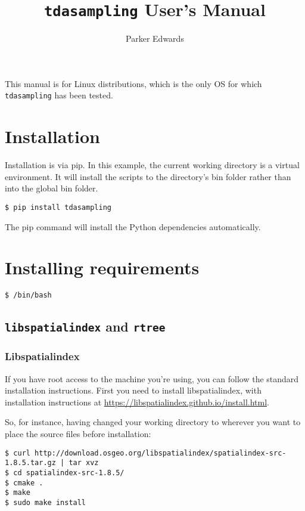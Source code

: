 \documentclass[11pt]{article}
\begin{document}
\title{\texttt{tdasampling} User's Manual}

\author{
Parker Edwards
}

\maketitle
\tableofcontents

This manual is for Linux distributions, which is the only OS for which \texttt{tdasampling} has been tested.

\section{Installation} 
Installation is via pip. In this example, the current working directory is a 
virtual environment. It will install the scripts to the directory's bin folder rather than into the global bin folder.

\begin{verbatim} 
$ pip install tdasampling
\end{verbatim} 

The pip command will install the Python dependencies automatically.

\section{Installing requirements}
\begin{verbatim} 
$ /bin/bash
\end{verbatim} 
\subsection{\texttt{libspatialindex} and \texttt{rtree}} 

\subsubsection{Libspatialindex}
If you have root access to the machine you're using, you can follow the standard installation instructions. First you need to install libspatialindex, with installation instructions at \url{https://libspatialindex.github.io/install.html}. 

So, for instance, having changed your working directory to wherever you want to place the source files before installation: 
\begin{verbatim} 
$ curl http://download.osgeo.org/libspatialindex/spatialindex-src-1.8.5.tar.gz | tar xvz
$ cd spatialindex-src-1.8.5/
$ cmake .
$ make 
$ sudo make install
\end{verbatim} 
\end{document}

